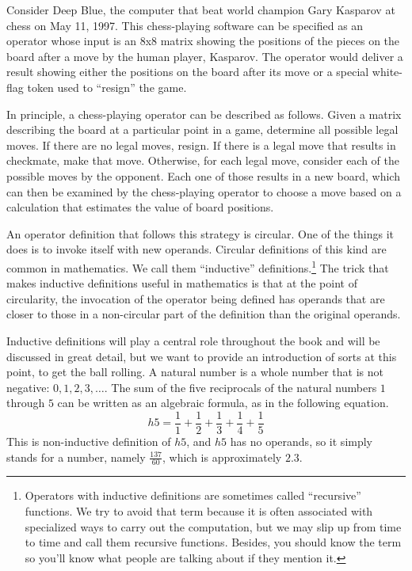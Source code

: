 Consider Deep Blue, the
computer that beat world champion Gary Kasparov at chess on May 11,
1997.  This chess-playing software can be specified as an operator whose input is
an 8x8 matrix showing the positions of the pieces
on the board after a move by the human player, Kasparov.  
The operator would deliver a result showing
either the positions on the board after its move or a special
white-flag token used to ``resign'' the game.

In principle, a chess-playing operator can be described as follows.
Given a matrix describing the board at a particular point in a game,
determine all possible legal moves.  If there
are no legal moves, resign.  If there is a legal move that results
in checkmate, make that move.  Otherwise, for each legal move, consider
each of the possible moves by the opponent.  Each one of those results
in a new board, which can then be examined by the chess-playing operator
to choose a move based on a calculation that estimates the value of
board positions.

An operator definition that follows this strategy is circular.
One of the things it does is to invoke itself with new operands.
Circular definitions of this kind are common in mathematics.
We call them ``inductive'' definitions.\footnote{Operators
with inductive definitions are sometimes
called ``recursive'' functions. We try to avoid that term because it is
often associated with specialized ways to carry out the computation,
but we may slip up from time to time and call them recursive functions.
Besides, you should know the term so you'll know what people are
talking about if they mention it.}
The trick that makes inductive definitions useful in mathematics
is that at the point of circularity,
the invocation of the operator being defined
has operands that are closer to those in a non-circular part of the
definition than the original operands.

Inductive definitions will play a central role throughout the book
and will be discussed in great detail, but we want to provide an
introduction of sorts at this point, to get the ball rolling.
A natural number is a whole number that is not negative: $0, 1, 2, 3, \dots$.
The sum of the five reciprocals of the
natural numbers $1$ through $5$
can be written as an algebraic formula, as in the following equation.
\begin{displaymath}
h5 = \frac{1}{1} + \frac{1}{2} + \frac{1}{3} + \frac{1}{4} + \frac{1}{5}
\end{displaymath}
This is non-inductive definition of $h5$,
and $h5$ has no operands, so it simply stands for a number,
namely $\frac{137}{60}$, which is approximately $2.3$.

